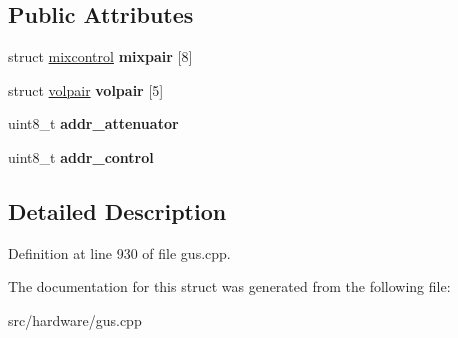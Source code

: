 \subsection*{Public Attributes}
\begin{DoxyCompactItemize}
\item 
\hypertarget{structgus__ICS2101_a7e5b7610442c6f3de38ae67487d9ccfa}{struct \hyperlink{structgus__ICS2101_1_1mixcontrol}{mixcontrol} {\bfseries mixpair} \mbox{[}8\mbox{]}}\label{structgus__ICS2101_a7e5b7610442c6f3de38ae67487d9ccfa}

\item 
\hypertarget{structgus__ICS2101_af99b01cfc9793b759b5c309fd605b563}{struct \hyperlink{structgus__ICS2101_1_1volpair}{volpair} {\bfseries volpair} \mbox{[}5\mbox{]}}\label{structgus__ICS2101_af99b01cfc9793b759b5c309fd605b563}

\item 
\hypertarget{structgus__ICS2101_a259bb6122df1b8689fdf2c5445f23623}{uint8\-\_\-t {\bfseries addr\-\_\-attenuator}}\label{structgus__ICS2101_a259bb6122df1b8689fdf2c5445f23623}

\item 
\hypertarget{structgus__ICS2101_ab1b4294e06737b43bd2fba7eeaee46ee}{uint8\-\_\-t {\bfseries addr\-\_\-control}}\label{structgus__ICS2101_ab1b4294e06737b43bd2fba7eeaee46ee}

\end{DoxyCompactItemize}


\subsection{Detailed Description}


Definition at line 930 of file gus.\-cpp.



The documentation for this struct was generated from the following file\-:\begin{DoxyCompactItemize}
\item 
src/hardware/gus.\-cpp\end{DoxyCompactItemize}

